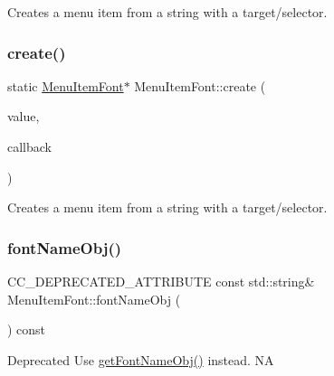 Creates a menu item from a string with a target/selector. \mbox{\label{classMenuItemFont_a60f83b22f153da6aade56cdae0b58ce2}} 
\subsubsection{\texorpdfstring{create()}{create()}\hspace{0.1cm}{\footnotesize\ttfamily [6/6]}}
{\footnotesize\ttfamily static \hyperlink{classMenuItemFont}{Menu\+Item\+Font}$\ast$ Menu\+Item\+Font\+::create (\begin{DoxyParamCaption}\item[{const std\+::string \&}]{value,  }\item[{const cc\+Menu\+Callback \&}]{callback }\end{DoxyParamCaption})\hspace{0.3cm}{\ttfamily [static]}}

Creates a menu item from a string with a target/selector. \mbox{\label{classMenuItemFont_a839ea5b34276117ca79a1f920ceb4c81}} 
\subsubsection{\texorpdfstring{font\+Name\+Obj()}{fontNameObj()}\hspace{0.1cm}{\footnotesize\ttfamily [1/2]}}
{\footnotesize\ttfamily C\+C\+\_\+\+D\+E\+P\+R\+E\+C\+A\+T\+E\+D\+\_\+\+A\+T\+T\+R\+I\+B\+U\+TE const std\+::string\& Menu\+Item\+Font\+::font\+Name\+Obj (\begin{DoxyParamCaption}{ }\end{DoxyParamCaption}) const\hspace{0.3cm}{\ttfamily [inline]}}

Deprecated Use \hyperlink{classMenuItemFont_a602990369beef06457153f39aefa42b9}{get\+Font\+Name\+Obj()} instead.  NA \mbox{\label{classMenuItemFont_a839ea5b34276117ca79a1f920ceb4c81}} 
